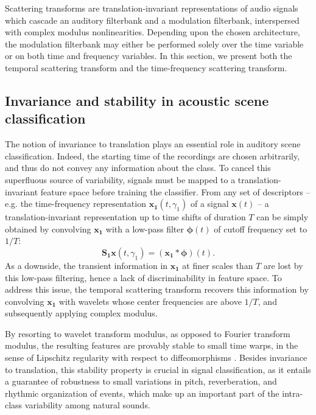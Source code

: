 \documentclass[journal]{IEEEtran}
\makeatletter
\newcommand*{\eg}{e.g.\@\xspace}
\makeatother
\begin{document}
Scattering transforms are translation-invariant representations of audio signals which cascade an auditory filterbank and a modulation filterbank, interspersed with complex modulus nonlinearities.
Depending upon the chosen architecture, the modulation filterbank may either be performed solely over the time variable or on both time and frequency variables.
In this section, we present both the temporal scattering transform and the time-frequency scattering transform.

\subsection{Invariance and stability in acoustic scene classification}
The notion of invariance to translation plays an essential role in auditory scene classification.
Indeed, the starting time of the recordings are chosen arbitrarily, and thus do not convey any information about the class.
To cancel this superfluous source of variability, signals must be mapped to a translation-invariant feature space before training the classifier.
From any set of descriptors -- \eg the time-frequency representation $\boldsymbol{x_1}(t,\gamma_1)$ of  a signal $\boldsymbol{x}(t)$ --
a translation-invariant representation up to time shifts of duration $T$ can be simply obtained
by convolving $\boldsymbol{x_1}$ with a low-pass filter $\boldsymbol{\phi}(t)$ of cutoff frequency
set to $1/T$:
\begin{equation}
\mathbf{S_1}\boldsymbol{x}(t, \gamma_1) = (\boldsymbol{x_1} \ast \boldsymbol{\phi}) (t).
\end{equation}
As a downside, the transient information in $\boldsymbol{x_1}$ at finer scales than $T$ are lost by this low-pass filtering, hence a lack of discriminability in feature space.
To address this issue, the temporal scattering transform recovers this information by convolving $\boldsymbol{x_1}$ with wavelets whose center frequencies are above $1/T$, and subsequently applying complex modulus.

By resorting to wavelet transform modulus, as opposed to Fourier transform modulus, the resulting features are provably stable to small time warps,
in the sense of Lipschitz regularity with respect to diffeomorphisms \cite{Mallat2012}.
Besides invariance to translation, this stability property is crucial in signal classification, as it entails a guarantee of robustness to small variations in pitch, reverberation, and rhythmic organization of events, which make up an important part of the intra-class variability among natural sounds.
\end{document}
